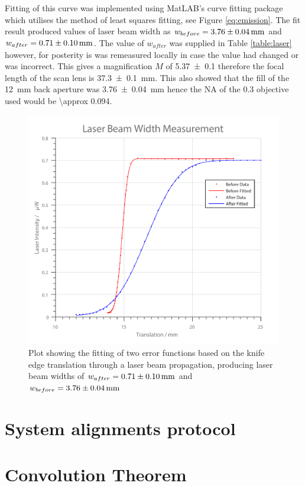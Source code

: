 Fitting of this curve was implemented using MatLAB's curve fitting package which utilises the method of least squares fitting, see Figure \ref{eq:emission}.
The fit result produced values of laser beam width as $w_{before} = \SI{3.76\pm0.04}{\milli\meter}$ and $w_{after} = \SI{0.71\pm0.1}{\milli\meter}$.
The value of $w_{after}$ was supplied in Table \ref{table:laser} however, for posterity is was remeasured locally in case the value had changed or was incorrect.
This gives a magnification $M$ of \SI{5.37 \pm 0.1}{} therefore the focal length of the scan lens is \SI{37.3\pm0.1}{\milli\meter}.
This also showed that the fill of the \SI{12}{\milli\meter} back aperture was \SI{3.76\pm0.04}{\milli\meter} hence the NA of the \num{0.3} objective used would be \SI{\approx 0.094}{}.

\begin{figure}
\centering
\includegraphics[width=0.7\linewidth]{./laser_width}
\caption[Laser Width Fitting]{Plot showing the fitting of two error functions based on the knife edge translation through a laser beam propagation, producing laser beam widths of $w_{after} = \SI{0.71\pm0.1}{\milli\meter}$ and $w_{before} = \SI{3.76\pm0.04}{\milli\meter}$}
\label{fig:laser_width}
\end{figure}

\section{System alignments protocol}


\section{Convolution Theorem}\label{appendix:convolution_theorem}



